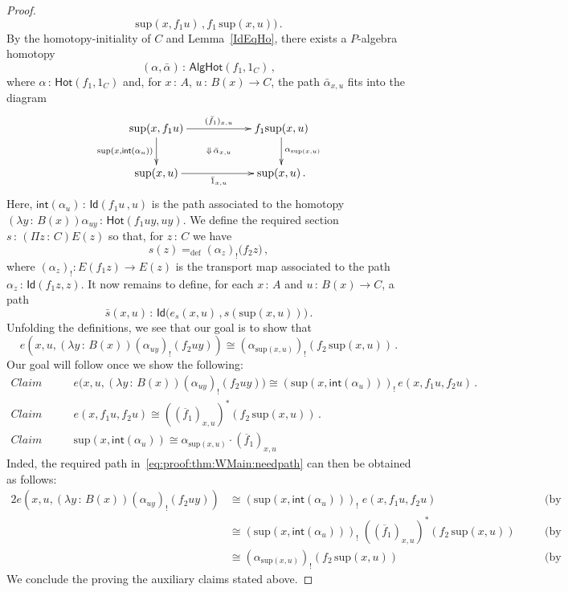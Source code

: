 \documentclass[10pt,a4paper,oneside,reqno]{amsart}
\numberwithin{equation}{section}
\theoremstyle{mythm}
\theoremstyle{mydef}
\theoremstyle{myrmk}
\newcommand{\defeq}{=_{\mathrm{def}}}
\newcommand{\co}{\,{:}\,}
\newcommand{\iso}{\cong}
\newcommand{\ct}{\cdot}
\newcommand{\Hot}{\mathsf{Hot}}
\renewcommand{\int}{\mathsf{int}}
\newcommand{\Id}{\mathsf{Id}}
\renewcommand{\sup}{\mathrm{sup}}
\newcommand{\AlgHot}{\mathsf{AlgHot}}
\begin{document}
\begin{proof}
\[\sup(x, f_1 u) \, , f_1 \, \sup(x,u)   ) \, .
\] 
By the homotopy-initiality of $C$ and Lemma~\ref{IdEqHo}, there exists a $P$-algebra 
homotopy 
\[
(\alpha, \bar{\alpha}) \co \AlgHot(f_1 , 1_C) \, ,
\]
where  $\alpha \co \Hot( f_1 , 1_C)$ and, for $x \co A$, $u \co B(x) \to C$, the path
$\bar{\alpha}_{x,u}$ fits into the diagram
\begin{equation}
\label{equ:alphabar}
{\vcenter{\hbox{\xymatrix@C=2cm{
\sup(x, f_1 u) \ar[r]^{(\bar{f}_1)_{x,u}} \ar[d]_{\sup(x, \int(\alpha_u))}  
\ar@{}[dr]|{\Downarrow \, \bar{\alpha}_{x,u}} & f_1 \sup(x,u) \ar[d]^{\alpha_{\sup(x,u)}} \\ 
\sup(x,u) \ar[r]_{\bar{1}_{x,u}} & \sup(x,u) \, . }}}}
\end{equation}
Here, $\int(\alpha_u )\co \Id( f_1  u \, ,  u)$ is the path associated to the homotopy
$(\lambda y \co B(x)) \alpha_{u y} \co \Hot( f_1 u y, u y)$. 
We define the required section $s \co (\Pi z \co C) E(z)$ so that, for $z \co C$ we have
\begin{equation*}
s(z) \defeq (\alpha_z)_{!} \big(  f_2 z \big) \, ,
\end{equation*}
where  $(\alpha_z)_{!} : E(f_1 z) \to E(z)$ is the transport map associated to the path
$\alpha_z \co \Id( f_1 z,  z)$. It now remains to  define, for each $x \co A$ and $u \co B(x)\to C$, 
a path
\[
\bar{s}(x,u) \co \Id\big(  e_s(x,u) \, , s(\sup(x,u)) \big) \, .
\] 
Unfolding the definitions, we see that our goal is to show that
\begin{equation}\label{eq:proof:thm:WMain:needpath}
e(x, u, (\lambda y \co B(x)) (\alpha_{u y})_{!} ( f_2 u y)   )  \iso
(\alpha_{\sup(x,u)})_{!} (  f_2 \, \sup(x,u) )  \, .
\end{equation}
Our goal will follow once we show the following:
\begin{align*}
\textit{Claim 1.} &  \qquad  e\big(x, u, (\lambda y \co B(x)) (\alpha_{uy})_{!}(f_2 u y) \big) \iso
(\sup(x, \int(\alpha_u)))_{!} \, e(x, f_1 u, f_2 u) \, . \\
\textit{Claim 2.} &  \qquad  e(x,  f_1 u, f_2 u) \iso ((\overline{f}_1)_{x,u})^* (f_2 \, \sup(x,u))   \, . \\ 
\textit{Claim 3.} &  \qquad  \sup(x, \int(\alpha_u)) \iso
\alpha_{\sup(x,u)}  \ct (\overline{f}_1)_{x,u}  
\end{align*}
Inded, the required path in~\eqref{eq:proof:thm:WMain:needpath} can then be obtained as follows:
 \begin{alignat*}{2} 
 e(x, u, (\lambda y \co B(x)) (\alpha_{uy})_{!}( f_2 u y)) 
 &  \iso  (\sup(x, \int(\alpha_u)))_{!} \;   e(x, f_1 u, f_2 u)  & \quad  & \text{(by Claim 1)}  \\
 & \iso    (\sup(x, \int(\alpha_u)))_{!} \;  ((\overline{f}_1)_{x,u})^*  (f_2 \, \sup(x,u) )  & \quad &  \text{(by Claim 2)}\\
 & \iso   (\alpha_{\sup(x,u)})_{!} ( f_2 \, \sup(x,u) )   & \quad & \text{(by Claim 3).} 
  \end{alignat*} 
We conclude the proving the auxiliary claims stated above.


\end{proof}
\end{document}
